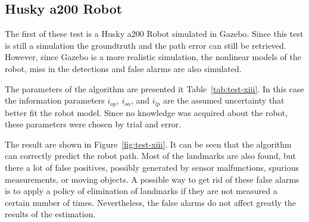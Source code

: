 \subsection{Husky a200 Robot}

The first of these test is a Husky a200 Robot simulated in Gazebo. Since this test is still a simulation the groundtruth and the path error can still be retrieved. However, since Gazebo is a more realistic simulation, the nonlinear models of the robot, miss in the detections and false alarms are also simulated. 

The parameters of the algorithm are presented it Table~\ref{tab:test-xiii}. In this case the information parameters $i_{op}$, $i_{oa}$, and $i_{lp}$ are the assumed uncertainty that better fit the robot model. Since no knowledge was acquired about the robot, these parameters were chosen by trial and error. 

The result are shown in Figure~\ref{fig:test-xiii}. It can be seen that the algorithm can correctly predict the robot path. Most of the landmarks are also found, but there a lot of false positives, possibly generated by sensor malfunctions, spurious measurements, or moving objects. A possible way to get rid of these false alarms is to apply a policy of elimination of landmarks if they are not measured a certain number of times. Nevertheless, the false alarms do not affect greatly the results of the estimation.

